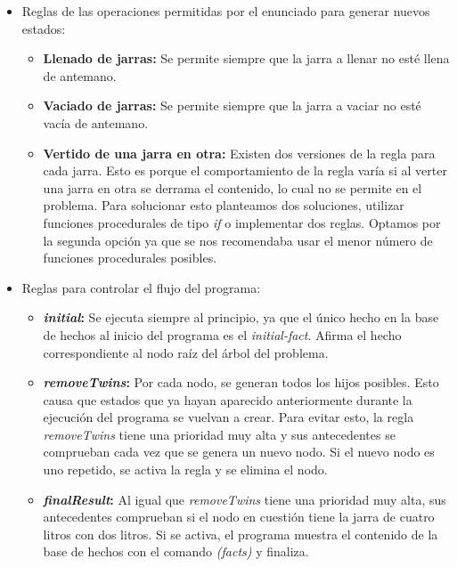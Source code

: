 \documentclass[11pt,a4paper,final]{article}
\begin{document}
\begin{itemize}
	\item Reglas de las operaciones permitidas por el enunciado para generar nuevos estados:
	
	\begin{itemize}
		\item \textbf{Llenado de jarras:} Se permite siempre que la jarra a llenar no esté llena de antemano.
		\item \textbf{Vaciado de jarras:} Se permite siempre que la jarra a vaciar no esté vacía de antemano.
		\item \textbf{Vertido de una jarra en otra:} Existen dos versiones de la regla para cada jarra. Esto es porque  el comportamiento de la regla varía si al verter una jarra en otra se derrama el contenido, lo cual no se permite en el problema. Para solucionar esto planteamos dos soluciones, utilizar funciones procedurales de tipo \emph{if} o implementar dos reglas. Optamos por la segunda opción ya que se nos recomendaba usar el menor número de funciones procedurales posibles.
	\end{itemize}
	
	\item Reglas para controlar el flujo del programa:
	
	\begin{itemize}
		\item \textbf{\emph{initial}:} Se ejecuta siempre al principio, ya que el único hecho en la base de hechos al inicio del programa es el \emph{initial-fact}. Afirma el hecho correspondiente al nodo raíz del árbol del problema.
		\item \textbf{\emph{removeTwins}:} Por cada nodo, se generan todos los hijos posibles. Esto causa que estados que ya hayan aparecido anteriormente durante la ejecución del programa se vuelvan a crear. Para evitar esto, la regla \emph{removeTwins} tiene una prioridad muy alta y sus antecedentes se comprueban cada vez que se genera un nuevo nodo. Si el nuevo nodo es uno repetido, se activa la regla y se elimina el nodo.
		\item \textbf{\emph{finalResult}:} Al igual que \emph{removeTwins} tiene una prioridad muy alta, sus antecedentes comprueban si el nodo en cuestión tiene la jarra de cuatro litros con dos litros. Si se activa, el programa muestra el contenido de la base de hechos con el comando \emph{(facts)} y finaliza.
	\end{itemize}
\end{itemize}
\end{document}
